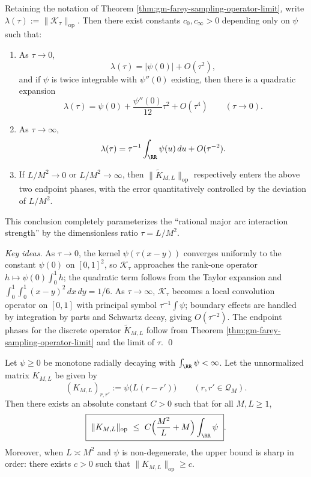 \begin{proposition}\label{prop:gm-farey-tau-spectral-phases}
Retaining the notation of Theorem \ref{thm:gm-farey-sampling-operator-limit}, write
\(
\lambda(\tau):=\|\mathcal{K}_\tau\|_{\mathrm{op}}
\).
Then there exist constants \(c_0,c_\infty>0\) depending only on \(\psi\) such that:
\begin{enumerate}
  \item As \(\tau\to 0\),
  \[
  \lambda(\tau)=|\psi(0)|+O(\tau^2),
  \]
  and if \(\psi\) is twice integrable with \(\psi''(0)\) existing, then there is a quadratic expansion
  \[
  \lambda(\tau)=\psi(0)+\frac{\psi''(0)}{12}\tau^2+O(\tau^4)
  \qquad(\tau\to 0).
  \]
  \item As \(\tau\to \infty\),
  \[
  \lambda(\tau)=\tau^{-1}\int_{\RR}\psi(u)\,du+O(\tau^{-2}).
  \]
  \item If \(L/M^2\to 0\) or \(L/M^2\to\infty\), then \(\|\widetilde K_{M,L}\|_{\mathrm{op}}\) respectively enters the above two endpoint phases, with the error quantitatively controlled by the deviation of \(L/M^2\).
\end{enumerate}
This conclusion completely parameterizes the ``rational major arc interaction strength'' by the dimensionless ratio \(\tau=L/M^2\).
\end{proposition}

\begin{proof}[Key ideas]
As \(\tau\to 0\), the kernel \(\psi(\tau(x-y))\) converges uniformly to the constant \(\psi(0)\) on \([0,1]^2\), so \(\mathcal{K}_\tau\) approaches the rank-one operator \(h\mapsto \psi(0)\int_0^1 h\); the quadratic term follows from the Taylor expansion and
\(
\int_0^1\!\int_0^1 (x-y)^2\,dx\,dy=1/6
\).
As \(\tau\to\infty\), \(\mathcal{K}_\tau\) becomes a local convolution operator on \([0,1]\) with principal symbol \(\tau^{-1}\int\psi\); boundary effects are handled by integration by parts and Schwartz decay, giving \(O(\tau^{-2})\).
The endpoint phases for the discrete operator \(\widetilde K_{M,L}\) follow from Theorem \ref{thm:gm-farey-sampling-operator-limit} and the limit of \(\tau\). \qed
\end{proof}

\begin{proposition}\label{prop:gm-farey-local-density-opnorm}
Let \(\psi\ge 0\) be monotone radially decaying with \(\int_{\RR}\psi<\infty\).
Let the unnormalized matrix \(K_{M,L}\) be given by
\[
(K_{M,L})_{r,r'}:=\psi\!\bigl(L(r-r')\bigr)\qquad (r,r'\in\mathcal{Q}_M).
\]
Then there exists an absolute constant \(C>0\) such that for all \(M,L\ge 1\),
\[
\boxed{\ \|K_{M,L}\|_{\mathrm{op}}\ \le\ C\Bigl(\frac{M^2}{L}+M\Bigr)\int_{\RR}\psi\ }.
\]
Moreover, when \(L\asymp M^2\) and \(\psi\) is non-degenerate, the upper bound is sharp in order: there exists \(c>0\) such that \(\|K_{M,L}\|_{\mathrm{op}}\ge c\).
\end{proposition}

